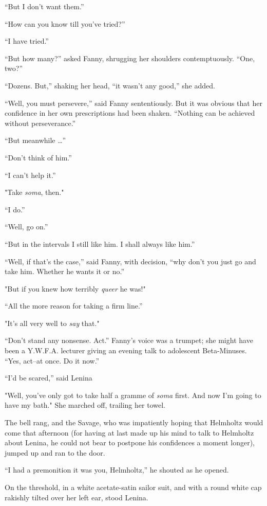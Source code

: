 \documentclass[12pt]{report}
\begin{document}
``But I don't want them.''

``How can you know till you've tried?''

``I have tried.''

``But how many?'' asked Fanny, shrugging her shoulders contemptuously.
``One, two?''

``Dozens. But,'' shaking her head, ``it wasn't any good,'' she added.

``Well, you must persevere,'' said Fanny sententiously. But it was
obvious that her confidence in her own prescriptions had been shaken.
``Nothing can be achieved without perseverance.''

``But meanwhile \ldots{}''

``Don't think of him.''

``I can't help it.''

"Take \emph{soma}, then."

``I do.''

``Well, go on.''

``But in the intervals I still like him. I shall always like him.''

``Well, if that's the case,'' said Fanny, with decision, ``why don't you
just go and take him. Whether he wants it or no.''

"But if you knew how terribly \emph{queer} he was!"

``All the more reason for taking a firm line.''

"It's all very well to \emph{say} that."

``Don't stand any nonsense. Act.'' Fanny's voice was a trumpet; she
might have been a Y.W.F.A. lecturer giving an evening talk to adolescent
Beta-Minuses. ``Yes, act--at once. Do it now.''

``I'd be scared,'' said Lenina

"Well, you've only got to take half a gramme of \emph{soma} first. And
now I'm going to have my bath." She marched off, trailing her towel.

The bell rang, and the Savage, who was impatiently hoping that Helmholtz
would come that afternoon (for having at last made up his mind to talk
to Helmholtz about Lenina, he could not bear to postpone his confidences
a moment longer), jumped up and ran to the door.

``I had a premonition it was you, Helmholtz,'' he shouted as he opened.

On the threshold, in a white acetate-satin sailor suit, and with a round
white cap rakishly tilted over her left ear, stood Lenina.
\end{document}
